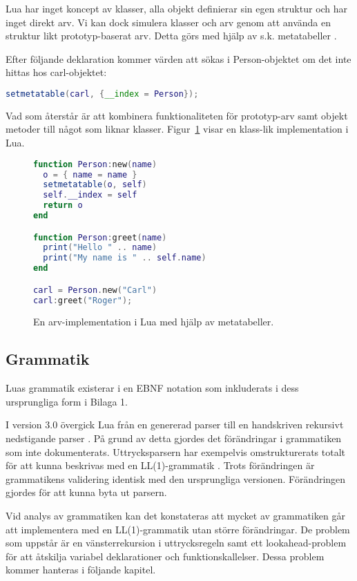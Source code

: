 Lua har inget koncept av klasser, alla objekt definierar sin egen struktur och
har inget direkt arv. Vi kan dock simulera klasser och arv genom att använda
en struktur likt prototyp-baserat arv. Detta görs med hjälp av s.k.
metatabeller \citep[s. 151]{ir06}.

Efter följande deklaration kommer värden att sökas i Person-objektet om det
inte hittas hos carl-objektet:
\\

\begin{lstlisting}[language=Lua]
setmetatable(carl, {__index = Person});
\end{lstlisting}
\vspace{-2em}
Vad som återstår är att kombinera funktionaliteten för prototyp-arv samt
objekt metoder till något som liknar klasser. Figur~\ref{fig:class} visar en
klass-lik implementation i Lua.

\begin{figure}[ht]
  \begin{lstlisting}[language=Lua]
function Person:new(name)
  o = { name = name }
  setmetatable(o, self)
  self.__index = self
  return o
end

function Person:greet(name)
  print("Hello " .. name)
  print("My name is " .. self.name)
end

carl = Person.new("Carl")
carl:greet("Roger");
  \end{lstlisting}
  \caption{En arv-implementation i Lua med hjälp av metatabeller.}
  \label{fig:class}
\end{figure}

\subsection{Grammatik}

Luas grammatik existerar i en EBNF notation som inkluderats i dess
ursprungliga form i Bilaga 1.

I version 3.0 övergick Lua från en genererad parser till en handskriven
rekursivt nedstigande parser \citep{luaimp}. På grund av detta gjordes det
förändringar i grammatiken som inte dokumenterats. Uttrycksparsern har
exempelvis omstrukturerats totalt för att kunna beskrivas med en
LL(1)-grammatik \citep[s. 175]{bf09}. Trots förändringen är grammatikens
validering identisk med den ursprungliga versionen. Förändringen gjordes för
att kunna byta ut parsern.

Vid analys av grammatiken kan det konstateras att mycket av grammatiken går att
implementera med en LL(1)-grammatik utan större förändringar. De problem som
uppstår är en vänsterrekursion i uttrycksregeln samt ett lookahead-problem för
att åtskilja variabel deklarationer och funktionskallelser. Dessa problem
kommer hanteras i följande kapitel.

